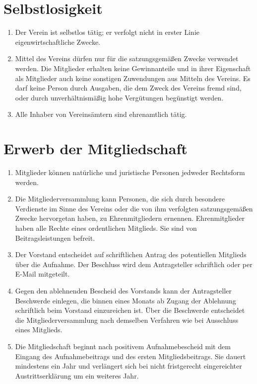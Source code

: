 \documentclass[a4paper, 12pt]{scrartcl}
\begin{document}
\section{Selbstlosigkeit}
\begin{enumerate}
	\item Der Verein ist selbstlos tätig; er verfolgt nicht in erster Linie eigenwirtschaftliche Zwecke.
	\item Mittel des Vereins dürfen nur für die satzungsgemäßen Zwecke verwendet werden. Die Mitglieder erhalten keine Gewinnanteile und in ihrer Eigenschaft als Mitglieder auch keine sonstigen Zuwendungen aus Mitteln des Vereins. Es darf keine Person durch Ausgaben, die dem Zweck des Vereins fremd sind, oder durch unverhältnismäßig hohe Vergütungen begünstigt werden.
	\item Alle Inhaber von Vereinsämtern sind ehrenamtlich tätig.
\end{enumerate}

\section{Erwerb der Mitgliedschaft}
\label{erwerb-der-mitgliedschaft}
\begin{enumerate}
	\item Mitglieder können natürliche und juristische Personen jedweder Rechtsform werden.
	\item Die Mitgliederversammlung kann Personen, die sich durch besondere Verdienste im Sinne des Vereins oder die von ihm verfolgten satzungsgemäßen Zwecke hervorgetan haben, zu Ehrenmitgliedern ernennen. Ehrenmitglieder haben alle Rechte eines ordentlichen Mitglieds. Sie sind von Beitragsleistungen befreit.
	\item Der Vorstand entscheidet auf schriftlichen Antrag des potentiellen  Mitglieds über die Aufnahme. Der Beschluss wird dem Antragsteller schriftlich 
oder per E-Mail mitgeteilt.
	\item Gegen den ablehnenden Bescheid des Vorstands kann der Antragsteller Beschwerde einlegen, die binnen eines Monats ab Zugang der Ablehnung schriftlich beim Vorstand einzureichen ist. Über die Beschwerde entscheidet die Mitgliederversammlung nach demselben Verfahren wie bei Ausschluss eines Mitglieds.
	\item \label{beginn-mitgliedschaft} Die Mitgliedschaft beginnt nach positivem Aufnahmebescheid mit dem Eingang des Aufnahmebeitrags und des ersten Mitgliedsbeitrags. Sie dauert mindestens ein Jahr und verlängert sich bei nicht fristgerecht eingereichter Austrittserklärung um ein weiteres Jahr.
\end{enumerate}
\end{document}
